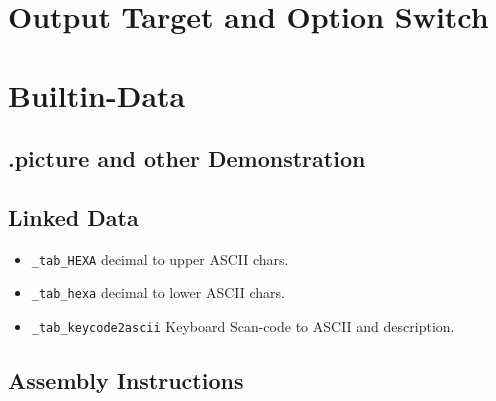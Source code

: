 \section{Output Target and Option Switch}


\section{Builtin-Data}

\subsection{.picture and other Demonstration}

\subsection{Linked Data}

\begin{itemize}
	\item \verb `_tab_HEXA` decimal to upper ASCII chars.
	\item \verb `_tab_hexa` decimal to lower ASCII chars.
	\item \verb `_tab_keycode2ascii` Keyboard Scan-code to ASCII and description.
\end{itemize}

\subsection{Assembly Instructions}


